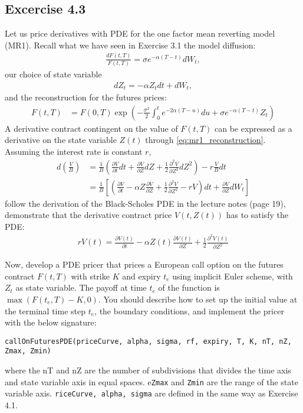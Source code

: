 \documentclass[10pt,a4paper,hidelinks,fleqn]{article}            %
\begin{document}
\subsection*{Excercise 4.3}
Let us price derivatives with PDE for the one factor mean reverting model (MR1). 
Recall what we have seen in Exercise 3.1 the model diffusion:
\begin{align*}
\frac{dF(t, T)}{F(t, T)} = \sigma e^{-\alpha (T- t)} dW_t,
\end{align*}
our choice of state variable
\begin{align}
dZ_t = -\alpha Z_t dt + dW_t,
\end{align}
and the reconstruction for the futures prices:
\begin{align}
F(t, T) & = F(0, T) \exp\left( -\frac{\sigma^2}{2} \int_0^t e^{-2\alpha (T - u)} du + \sigma e^{-\alpha(T-t)} Z_t \right)
\label{eq:mr1_reconstruction}
\end{align}
A derivative contract contingent on the value of $F(t, T)$ can be expressed as a derivative on the state variable $Z(t)$ through \eqref{eq:mr1_reconstruction}.
Assuming the interest rate is constant $r$,
\begin{align}
d\left(\frac{V}{B}\right) & = \frac{1}{B}\left(\frac{\partial V}{\partial t} dt + \frac{\partial V}{\partial Z} dZ + \frac{1}{2}\frac{\partial^2 V}{\partial Z^2} dZ^2 \right) - r\frac{V}{B}dt  \\
   & = \frac{1}{B} \left[\left(\frac{\partial V}{\partial t} - \alpha Z\frac{\partial V}{\partial Z} + \frac{1}{2} \frac{\partial^2 V}{\partial Z^2} - rV\right)dt + \frac{\partial V}{\partial Z} dW_t \right]
\end{align}
follow the derivation of the Black-Scholes PDE in the lecture notes (page 19),
demonstrate that the derivative contract price $V(t, Z(t))$ has to satisfy the PDE:
\begin{align}
rV(t) = \frac{\partial V(t)}{\partial t} - \alpha Z(t) \frac{\partial V(t)}{\partial Z} + \frac{1}{2} \frac{\partial^2 V(t)}{\partial Z^2}
\end{align}


Now, develop a PDE pricer that prices a European call option on the futures contract $F(t, T)$ with strike $K$ and expiry $t_e$ using implicit Euler scheme, with $Z_t$ as state variable.
The payoff at time $t_e$ of the function is $\max(F(t_e, T) - K, 0)$.
You should describe how to set up the initial value at the terminal time step $t_e$, the boundary conditions, and implement the pricer with the below signature:
\begin{verbatim}
callOnFuturesPDE(priceCurve, alpha, sigma, rf, expiry, T, K, nT, nZ, Zmax, Zmin)
\end{verbatim}
where the nT and nZ are the number of subdivisions that divides the time axis and state variable axis in equal spaces.
e\verb=Zmax= and \verb=Zmin= are the range of the state variable axis. \verb=riceCurve, alpha, sigma= are defined in the same way as Exercise 4.1.
\end{document}

